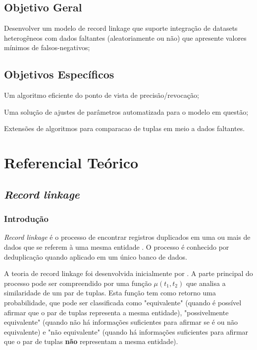 \documentclass[
	12pt,				%
	openany,			%
	twoside,			%
	a4paper,			%
	brazil,				%
	]{unimontes-ppgmsc-abntex2}
\begin{document}
\section{Objetivo Geral} Desenvolver um modelo de record linkage que suporte integração de datasets heterogêneos com dados faltantes (aleatoriamente ou não) que apresente valores mínimos de falsos-negativos;

\section{Objetivos Específicos}
\begin{alineas}
        \item Um algoritmo eficiente do ponto de vista de precisão/revocação;
        \item Uma solução de ajustes de parâmetros automatizada para o modelo em questão;
        \item Extensões de algoritmos para comparacao de tuplas em meio a dados faltantes. 
\end{alineas}


\chapter{Referencial Teórico}
\section{\textit{Record linkage}}
\subsection{Introdução}

\textit{Record linkage} é o processo de encontrar registros duplicados em uma ou mais de dados que se referem à uma mesma entidade \cite{survey}. O processo é conhecido por deduplicação quando aplicado em um único banco de dados.

A teoria de record linkage foi desenvolvida inicialmente por \cite{fellegi}. A parte principal do processo pode ser compreendido por uma função $\mu(t_1,t_2)$ que analisa a similaridade de um par de tuplas. Esta função tem como retorno uma probabilidade, que pode ser classificada como "equivalente" (quando é possível afirmar que o par de tuplas representa a mesma entidade), "possivelmente equivalente" (quando não há informações suficientes para afirmar se é ou não equivalente) e "não equivalente" (quando há informações suficientes para afirmar que o par de tuplas \textbf{não} representam a mesma entidade).
\end{document}
